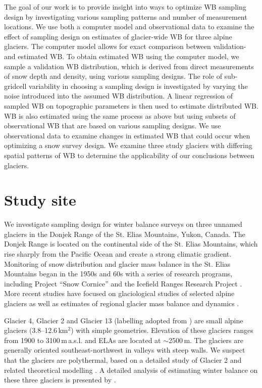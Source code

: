 \documentclass[twocolumn,letterpaper]{igs}
\begin{document}
The goal of our work is to provide insight into ways to optimize WB sampling design by investigating various sampling patterns and number of measurement locations. We use both a computer model and observational data to examine the effect of sampling design on estimates of glacier-wide WB for three alpine glaciers. The computer model allows for exact comparison between validation- and estimated WB. To obtain estimated WB using the computer model, we sample a validation WB distribution, which is derived from direct measurements of snow depth and density, using various sampling designs. The role of sub-gridcell variability in choosing a sampling design is investigated by varying the noise introduced into the assumed WB distribution. A linear regression of sampled WB on topographic parameters is then used to estimate distributed WB. WB is also estimated using the same process as above but using subsets of observational WB that are based on various sampling designs. We use observational data to examine changes in estimated WB that could occur when optimizing a snow survey design. We examine three study glaciers with differing spatial patterns of WB to determine the applicability of our conclusions between glaciers. 



\section{Study site}

We investigate sampling design for winter balance surveys on three unnamed glaciers in the Donjek Range of the St. Elias Mountains, Yukon, Canada. The Donjek Range is located on the continental side of the St. Elias Mountains, which rise sharply from the Pacific Ocean and create a strong climatic gradient. Monitoring of snow distribution and glacier mass balance in the St. Elias Mountains began in the 1950s and 60s with a series of research programs, including Project ``Snow Cornice''  and the Icefield Ranges Research Project \citep{Wood1948, Danby2003}. More recent studies have focused on glaciological studies of selected alpine glaciers \citep[e.g.][]{Clarke2014} as well as estimates of regional glacier mass balance and dynamics \citep[e.g.][]{Arendt2008, Burgess2013,Waechter2015}. 

Glacier 4, Glacier 2 and Glacier 13 (labelling adopted from \cite{Crompton2016}) are small alpine glaciers (3.8--12.6\,km$^2$) with simple geometries. Elevation of these glaciers ranges from 1900 to 3100\,m\,a.s.l. and ELAs are located at $\sim$2500\,m. The glaciers are generally oriented southeast-northwest in valleys with steep walls. We suspect that the glaciers are polythermal, based on a detailed study of Glacier 2 \citep{Wilson2013} and related theoretical modelling \citep{Wilson2013a}. A detailed analysis of estimating winter balance on these three glaciers is presented by \cite{Pulwicki2017}.
\end{document}
